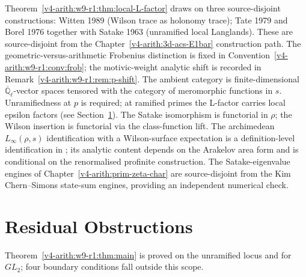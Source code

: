 \begin{remark}
\label{v4-arith:w9-r1:rem:langlands-sources}
Theorem~\ref{v4-arith:w9-r1:thm:local-L-factor} draws on three
source-disjoint constructions: Witten 1989 (Wilson trace as holonomy
trace); Tate 1979 and Borel 1976 together with Satake 1963 (unramified
local Langlands). These are source-disjoint from the Chapter~\ref{v4-arith:3d-acs-E1bar}
construction path.
The geometric-versus-arithmetic Frobenius distinction is fixed in
Convention~\ref{v4-arith:w9-r1:conv:frob}; the motivic-weight analytic
shift is recorded in Remark~\ref{v4-arith:w9-r1:rem:p-shift}.
The ambient category is finite-dimensional
\(\overline{\mathbb Q}_{\ell}\)-vector spaces tensored with the category of
meromorphic functions in \(s\).
Unramifiedness at \(p\) is required; at ramified primes the L-factor
carries local epsilon factors (see Section~\ref{v4-arith:w9-r1:sec:residual}).
The Satake isomorphism is functorial in \(\rho\); the Wilson insertion
is functorial via the class-function lift.
The archimedean \(L_{\infty}(\rho,s)\) identification with a
Wilson-surface expectation is a definition-level identification in
; its analytic content depends on
the Arakelov area form and is conditional on the renormalised profinite
construction.
The Satake-eigenvalue engines of
Chapter~\ref{v4-arith:prim-zeta-char} are source-disjoint from the Kim
Chern--Simons state-sum engines, providing an independent numerical check.
\end{remark}

\section{Residual Obstructions}
\label{v4-arith:w9-r1:sec:residual}

Theorem~\ref{v4-arith:w9-r1:thm:main} is proved on the unramified locus
and for \(GL_{2}\); four boundary conditions fall outside this scope.

